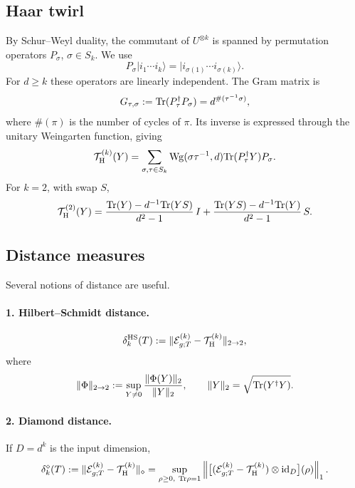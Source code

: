 \documentclass{article}
\theoremstyle{definition}
\begin{document}
\subsection{Haar twirl}

By Schur--Weyl duality, the commutant of $U^{\otimes k}$ is spanned by
permutation operators $P_\sigma$, $\sigma\in S_k$.  We use
\begin{equation}
    P_\sigma|i_1\cdots i_k\rangle
    =|i_{\sigma(1)}\cdots i_{\sigma(k)}\rangle.
\end{equation}
For $d\ge k$ these operators are linearly independent.  The Gram matrix is
\begin{equation}
    G_{\tau,\sigma}
    :={\rm Tr}(P_\tau^\dagger P_\sigma)
    =d^{\#(\tau^{-1}\sigma)},
\end{equation}
where $\#(\pi)$ is the number of cycles of $\pi$.  Its inverse is expressed
through the unitary Weingarten function, giving
\begin{equation}
    {\cal T}_{\rm H}^{(k)}(Y)
    =\sum_{\sigma,\tau\in S_k}
      {\rm Wg}(\sigma\tau^{-1},d)
      {\rm Tr}(P_\tau^\dagger Y)P_\sigma.
\end{equation}
For $k=2$, with swap $S$,
\begin{equation}
    {\cal T}_{\rm H}^{(2)}(Y)
    =\frac{{\rm Tr}(Y)-d^{-1}{\rm Tr}(YS)}{d^2-1}\,I
     +\frac{{\rm Tr}(YS)-d^{-1}{\rm Tr}(Y)}{d^2-1}\,S.
\end{equation}

\subsection{Distance measures}

Several notions of distance are useful.

\paragraph{1. Hilbert--Schmidt distance.}
\begin{equation}
    \delta_k^{\rm HS}(T)
    :=\|{\cal E}_{g;T}^{(k)}-{\cal T}_{\rm H}^{(k)}\|_{2\to2},
\end{equation}
where
\begin{equation}
    \|\Phi\|_{2\to2}
    :=\sup_{Y\neq0}\frac{\|\Phi(Y)\|_2}{\|Y\|_2},
    \qquad
    \|Y\|_2=\sqrt{{\rm Tr}(Y^\dagger Y)}.
\end{equation}

\paragraph{2. Diamond distance.}
If $D=d^k$ is the input dimension,
\begin{equation}
    \delta_k^\diamond(T)
    :=\|{\cal E}_{g;T}^{(k)}-{\cal T}_{\rm H}^{(k)}\|_\diamond
    =\sup_{\rho\ge0,\ {\rm Tr}\rho=1}
      \left\|
       \bigl[({\cal E}_{g;T}^{(k)}-{\cal T}_{\rm H}^{(k)})
       \otimes{\rm id}_{D}\bigr](\rho)
      \right\|_1.
\end{equation}
\end{document}
